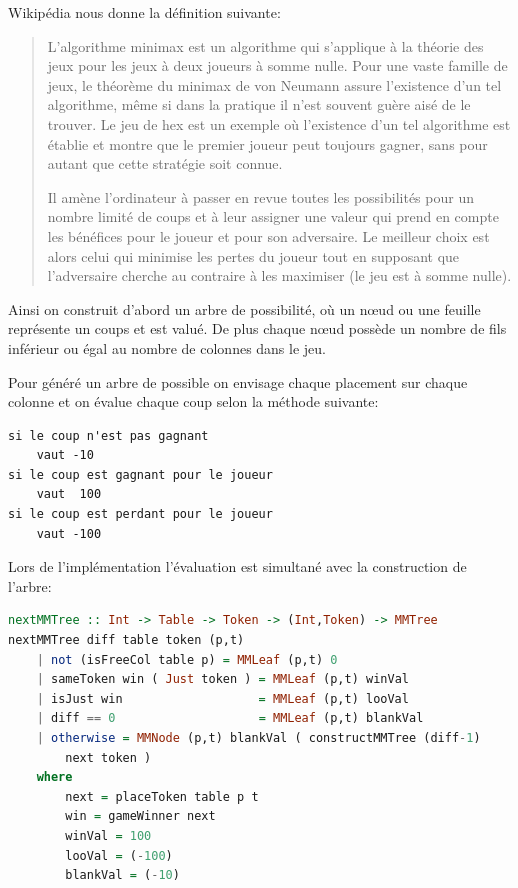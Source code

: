 \documentclass[a4paper]{article}
\begin{document}
Wikipédia nous donne la définition suivante:
\begin{quote}
L'algorithme minimax est un algorithme qui s'applique à la théorie des jeux pour les jeux à deux joueurs à somme nulle. Pour une vaste famille de jeux, le théorème du minimax de von Neumann assure l'existence d'un tel algorithme, même si dans la pratique il n'est souvent guère aisé de le trouver. Le jeu de hex est un exemple où l'existence d'un tel algorithme est établie et montre que le premier joueur peut toujours gagner, sans pour autant que cette stratégie soit connue.

Il amène l'ordinateur à passer en revue toutes les possibilités pour un nombre limité de coups et à leur assigner une valeur qui prend en compte les bénéfices pour le joueur et pour son adversaire. Le meilleur choix est alors celui qui minimise les pertes du joueur tout en supposant que l'adversaire cherche au contraire à les maximiser (le jeu est à somme nulle).
\end{quote}

Ainsi on construit d'abord un arbre de possibilité, où un n\oe ud ou une feuille représente un coups et est valué. De plus chaque n\oe ud possède un nombre de fils inférieur ou égal au nombre de colonnes dans le jeu.

Pour généré un arbre de possible on envisage chaque placement sur chaque colonne et on évalue chaque coup selon la méthode suivante:

\begin{lstlisting}
si le coup n'est pas gagnant
	vaut -10
si le coup est gagnant pour le joueur
	vaut  100
si le coup est perdant pour le joueur
	vaut -100
\end{lstlisting}

Lors de l'implémentation l'évaluation est simultané avec la construction de l'arbre:

\begin{lstlisting}[language=haskell]
nextMMTree :: Int -> Table -> Token -> (Int,Token) -> MMTree
nextMMTree diff table token (p,t)
	| not (isFreeCol table p) = MMLeaf (p,t) 0
	| sameToken win ( Just token ) = MMLeaf (p,t) winVal
	| isJust win                   = MMLeaf (p,t) looVal
	| diff == 0                    = MMLeaf (p,t) blankVal
	| otherwise = MMNode (p,t) blankVal ( constructMMTree (diff-1) 
		next token )
	where
		next = placeToken table p t
		win = gameWinner next
		winVal = 100
		looVal = (-100)
		blankVal = (-10)
\end{lstlisting}
\end{document}
